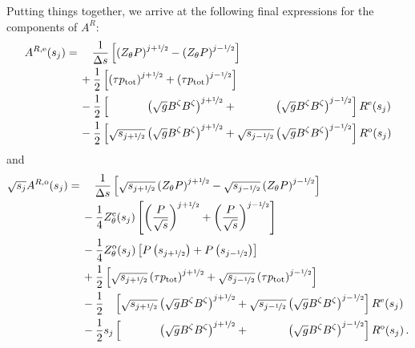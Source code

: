 Putting things together, we arrive at the following final expressions for the components of $A^R$:
\begin{align}
  A^{R,\mathrm{e}} (s_j)
  =&\, \phantom{+}~ \frac{1}{\Delta s} \left[ \left( Z_\theta P \right)^{j+\half} - \left( Z_\theta P \right)^{j-\half} \right] \nonumber \\
  ~&\,          +   \frac{1}{2} \left[ \left( \tau p_\mathrm{tot} \right)^{j+\half} + \left( \tau p_\mathrm{tot} \right)^{j-\half} \right] \nonumber \\
  ~&\,          -   \frac{1}{2} \left[   \phantom{\sqrt{s_{j+\half}}} \left( \sqrt{g} B^\zeta B^\zeta \right)^{j+\half}
                                       + \phantom{\sqrt{s_{j-\half}}} \left( \sqrt{g} B^\zeta B^\zeta \right)^{j-\half} \right] R^\mathrm{e}(s_j) \nonumber \\
  ~&\,          -   \frac{1}{2} \left[            \sqrt{s_{j+\half}}  \left( \sqrt{g} B^\zeta B^\zeta \right)^{j+\half}
                                       +          \sqrt{s_{j-\half}}  \left( \sqrt{g} B^\zeta B^\zeta \right)^{j-\half} \right] R^\mathrm{o}(s_j) \label{eqn:armn_e}
\end{align}
and
\begin{align}
  \sqrt{s_j} A^{R,\mathrm{o}} (s_j)
  =&\, \phantom{+}~ \frac{1}{\Delta s} \left[ \sqrt{s_{j+\half}} \left( Z_\theta P \right)^{j+\half} - \sqrt{s_{j-\half}} \left( Z_\theta P \right)^{j-\half} \right] \nonumber \\
  ~&\,          -   \frac{1}{4} Z_\theta^\mathrm{e}(s_j) \left[ \left( \frac{P}{\sqrt{s}} \right)^{j+\half} + \left( \frac{P}{\sqrt{s}} \right)^{j-\half} \right] \nonumber \\
  ~&\,          -   \frac{1}{4} Z_\theta^\mathrm{o}(s_j) \left[ P \left(s_{j+\half}\right) + P\left(s_{j-\half}\right) \right] \nonumber \\
  ~&\,          +   \frac{1}{2}               \left[            \sqrt{s_{j+\half}}  \left( \tau p_\mathrm{tot} \right)^{j+\half}
                                                     +          \sqrt{s_{j-\half}}  \left( \tau p_\mathrm{tot} \right)^{j-\half} \right] \nonumber \\
  ~&\,          -   \frac{1}{2} \phantom{s_j} \left[            \sqrt{s_{j+\half}}  \left( \sqrt{g} B^\zeta B^\zeta \right)^{j+\half}
                                                     +          \sqrt{s_{j-\half}}  \left( \sqrt{g} B^\zeta B^\zeta \right)^{j-\half} \right] R^\mathrm{e}(s_j) \nonumber \\
  ~&\,          -   \frac{1}{2}          s_j  \left[   \phantom{\sqrt{s_{j+\half}}} \left( \sqrt{g} B^\zeta B^\zeta \right)^{j+\half}
                                                     + \phantom{\sqrt{s_{j-\half}}} \left( \sqrt{g} B^\zeta B^\zeta \right)^{j-\half} \right] R^\mathrm{o}(s_j) \label{eqn:armn_0} \, .
\end{align}
